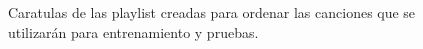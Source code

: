 \documentclass[conference]{IEEEtran}
\begin{document}
\begin{figure}[htbp]
	\caption{ Caratulas de las playlist creadas para ordenar las canciones que se utilizarán para entrenamiento y pruebas. }
\end{figure}
\end{document}

